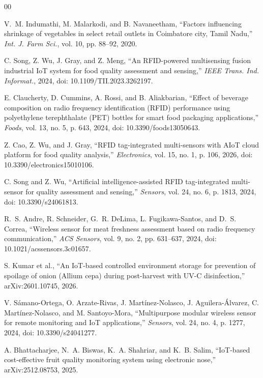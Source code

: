 \documentclass[conference]{IEEEtran}
\begin{document}
\begin{thebibliography}{00}

 V.~M. Indumathi, M. Malarkodi, and B. Navaneetham, ``Factors influencing shrinkage of vegetables in select retail outlets in Coimbatore city, Tamil Nadu,'' \textit{Int. J. Farm Sci.}, vol. 10, pp. 88--92, 2020.

 C. Song, Z. Wu, J. Gray, and Z. Meng, ``An RFID-powered multisensing fusion industrial IoT system for food quality assessment and sensing,'' \textit{IEEE Trans. Ind. Informat.}, 2024, doi: 10.1109/TII.2023.3262197.

 E. Claucherty, D. Cummins, A. Rossi, and B. Aliakbarian, ``Effect of beverage composition on radio frequency identification (RFID) performance using polyethylene terephthalate (PET) bottles for smart food packaging applications,'' \textit{Foods}, vol. 13, no. 5, p. 643, 2024, doi: 10.3390/foods13050643.

 Z. Cao, Z. Wu, and J. Gray, ``RFID tag-integrated multi-sensors with AIoT cloud platform for food quality analysis,'' \textit{Electronics}, vol. 15, no. 1, p. 106, 2026, doi: 10.3390/electronics15010106.

 C. Song and Z. Wu, ``Artificial intelligence-assisted RFID tag-integrated multi-sensor for quality assessment and sensing,'' \textit{Sensors}, vol. 24, no. 6, p. 1813, 2024, doi: 10.3390/s24061813.

 R.~S. Andre, R. Schneider, G.~R. DeLima, L. Fugikawa-Santos, and D.~S. Correa, ``Wireless sensor for meat freshness assessment based on radio frequency communication,'' \textit{ACS Sensors}, vol. 9, no. 2, pp. 631--637, 2024, doi: 10.1021/acssensors.3c01657.

 S. Kumar et al., ``An IoT-based controlled environment storage for prevention of spoilage of onion (Allium cepa) during post-harvest with UV-C disinfection,'' arXiv:2601.10745, 2026.

 V. S\'amano-Ortega, O. Arzate-Rivas, J. Mart\'inez-Nolasco, J. Aguilera-\'Alvarez, C. Mart\'inez-Nolasco, and M. Santoyo-Mora, ``Multipurpose modular wireless sensor for remote monitoring and IoT applications,'' \textit{Sensors}, vol. 24, no. 4, p. 1277, 2024, doi: 10.3390/s24041277.

 A. Bhattacharjee, N.~A. Biswas, K.~A. Shahriar, and K.~B. Salim, ``IoT-based cost-effective fruit quality monitoring system using electronic nose,'' arXiv:2512.08753, 2025.


\end{thebibliography}
\end{document}
